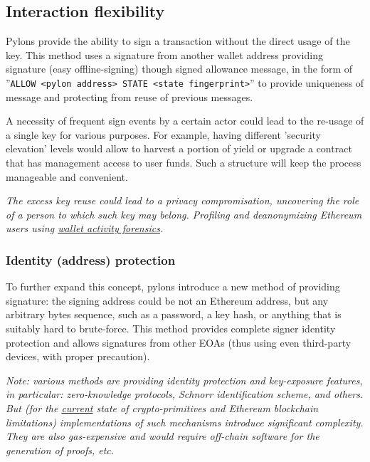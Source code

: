 \documentclass[12pt]{article}
\begin{document}
\bigskip
\label{sec_interaction_flexibility}
\subsection{Interaction flexibility}

Pylons provide the ability to sign a transaction without the direct usage of the key. This method uses a signature from another wallet address providing signature (easy offline-signing) though signed allowance message, in the form of ''\texttt{ALLOW <pylon address> STATE <state fingerprint>}'' to provide uniqueness of message and protecting from reuse of previous messages.

\medskip
A necessity of frequent sign events by a certain actor could lead to the re-usage of a single key for various purposes. For example, having different 'security elevation' levels would allow to harvest a portion of yield or upgrade a contract that has management access to user funds. Such a structure will keep the process manageable and convenient.

\medskip
\emph{The excess key reuse could lead to a privacy compromisation, uncovering the role of a person to which such key may belong. Profiling and deanonymizing Ethereum users using \href{https://www.smartcontractresearch.org/t/research-summary-blockchain-is-watching-you-profiling-and-deanonymizing-ethereum-users/564}{wallet activity forensics}\cite{contract_forensics}.}

\medskip
\label{sec_identity_protection}
\subsubsection{Identity (address) protection}

To further expand this concept, pylons introduce a new method of providing signature: the signing address could be not an Ethereum address, but any arbitrary bytes sequence, such as a password, a key hash, or anything that is suitably hard to brute-force. This method provides complete signer identity protection and allows signatures from other EOAs (thus using even third-party devices, with proper precaution).

\medskip
\emph{Note: various methods are providing identity protection and key-exposure features, in particular: zero-knowledge protocols, Schnorr identification scheme, and others. But (for the \underline{current} state of crypto-primitives and Ethereum blockchain limitations) implementations of such mechanisms introduce significant complexity. They are also gas-expensive and would require off-chain software for the generation of proofs, etc.}
\end{document}
